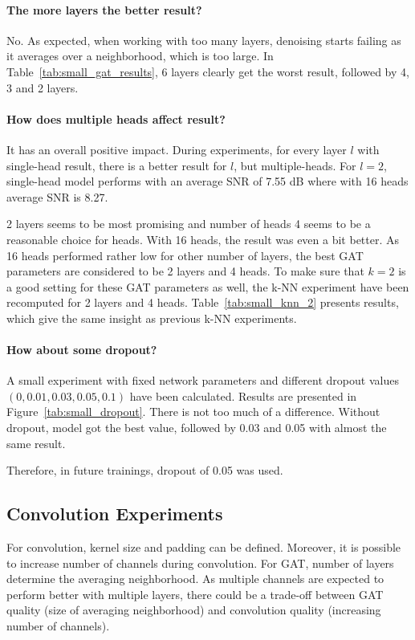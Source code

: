 \paragraph{The more layers the better result?}
No. As expected, when working with too many layers, denoising starts failing as it averages over a
neighborhood, which is too large. In Table~\ref{tab:small_gat_results}, 6 layers clearly get the worst result,
followed by 4, 3 and 2 layers.

\paragraph{How does multiple heads affect result?}
It has an overall positive impact. 
During experiments, for every layer $l$ with single-head result, there is a better result for $l$, but multiple-heads. 
For $l=2$, single-head model performs with an average SNR of 7.55 dB where with 16 heads average SNR is 8.27.

2 layers seems to be most promising and number of heads 4 seems to be a reasonable choice for heads.
With 16 heads, the result was even a bit better. As 16 heads performed rather low for other number of layers, 
the best GAT parameters are considered to be 2 layers and 4 heads.
To make sure that $k=2$ is a good setting for these GAT parameters as well, the k-NN experiment
have been recomputed for 2 layers and 4 heads. Table~\ref{tab:small_knn_2} presents results, which 
give the same insight as previous k-NN experiments.

\paragraph{How about some dropout?}
A small experiment with fixed network parameters
and different dropout values $(0, 0.01, 0.03, 0.05, 0.1)$ have been calculated. 
Results are presented in Figure~\ref{tab:small_dropout}.
There is not too much of a difference. Without dropout, model got the best value, followed by 
0.03 and 0.05 with almost the same result. 

Therefore, in future trainings, dropout of 0.05 was used.

\subsection{Convolution Experiments}

For convolution, kernel size and padding can be defined.
Moreover, it is possible to increase number of channels during convolution. 
For GAT, number of layers determine the averaging neighborhood.
As multiple channels are expected to perform better with multiple layers,
there could be a trade-off between GAT quality (size of averaging neighborhood) and convolution quality (increasing number of channels). 

